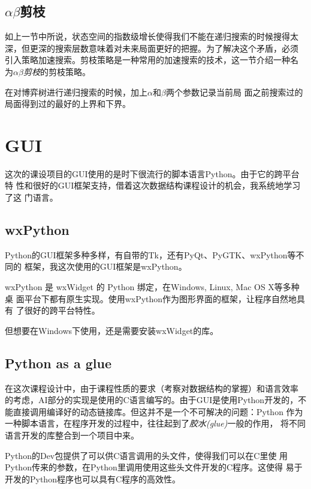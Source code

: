\documentclass[oneside,a4paper]{article}
\begin{document}
\subsection{$\alpha\beta$剪枝}
\label{sec:alpha-beta}

如上一节中所说，状态空间的指数级增长使得我们不能在递归搜索的时候搜得太
深，但更深的搜索层数意味着对未来局面更好的把握。为了解决这个矛盾，必须
引入策略加速搜索。剪枝策略是一种常用的加速搜索的技术，这一节介绍一种名
为\emph{$\alpha\beta$剪枝}的剪枝策略。

在对博弈树进行递归搜索的时候，加上$\alpha$和$\beta$两个参数记录当前局
面之前搜索过的局面得到过的最好的上界和下界。



\section{GUI}
\label{sec:GUI}
这次的课设项目的GUI使用的是时下很流行的脚本语言Python。由于它的跨平台特
性和很好的GUI框架支持，借着这次数据结构课程设计的机会，我系统地学习了这
门语言。


\subsection{wxPython}
\label{sec:wxPython}

Python的GUI框架多种多样，有自带的Tk，还有PyQt、PyGTK、wxPython等不同的
框架，我这次使用的GUI框架是wxPython。

wxPython 是 wxWidget 的 Python 绑定，在Windows, Linux, Mac OS X等多种桌
面平台下都有原生实现。使用wxPython作为图形界面的框架，让程序自然地具有
了很好的跨平台特性。

但想要在Windows下使用，还是需要安装wxWidget的库。

\subsection{Python as a glue}
\label{sec:implementation}

在这次课程设计中，由于课程性质的要求（考察对数据结构的掌握）和语言效率
的考虑，AI部分的实现是使用的C语言编写的。由于GUI是使用Python开发的，不
能直接调用编译好的动态链接库。但这并不是一个不可解决的问题：Python 作为
一种脚本语言，在程序开发的过程中，往往起到了\emph{胶水(glue)}一般的作用，
将不同语言开发的库整合到一个项目中来。

Python的Dev包提供了可以供C语言调用的头文件，使得我们可以在C里使
用Python传来的参数，在Python里调用使用这些头文件开发的C程序。这使得
易于开发的Python程序也可以具有C程序的高效性。
\end{document}
